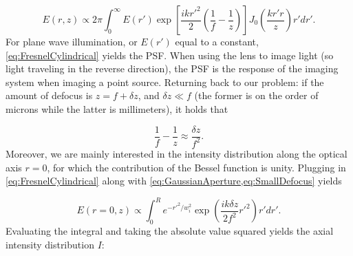 \begin{equation}\label{eq:FresnelCylindrical}
	E(r,z) \propto 2\pi
	\int_0^\infty E(r')\exp{\left[\frac{i k r'^2}{2}\left(\frac{1}{f}-\frac{1}{z}\right)\right]}
	J_0\left(\frac{k r'r}{z}\right)r' dr'.
\end{equation}
For plane wave illumination, or $E(r')$ equal to a constant, \cref{eq:FresnelCylindrical} yields the \ac{PSF}.
When using the lens to image light (so light traveling in the reverse direction), the PSF is the response of the imaging system when imaging a point source. 
Returning back to our problem: if the amount of defocus is $z=f+\delta z$, and $\delta z \ll f$ (the former is on the order of microns while the latter is millimeters), it holds that

\begin{equation}\label{eq:SmallDefocus}
	\frac{1}{f}-\frac{1}{z}\approx
	\frac{\delta z}{f^2}.
\end{equation}
Moreover, we are mainly interested in the intensity distribution along the optical axis $r=0$, for which the contribution of the Bessel function is unity.
Plugging in \cref{eq:FresnelCylindrical} along with \cref{eq:GaussianAperture,eq:SmallDefocus} yields

\begin{equation}
	E(r=0,z) \propto \int_0^R e^{-r'^2/w_i^2} \exp{\left(
		\frac{i k \delta z}{2f^2}r'^2
		\right)} r'dr'.
\end{equation}
Evaluating the integral and taking the absolute value squared yields the axial intensity distribution $I$:

